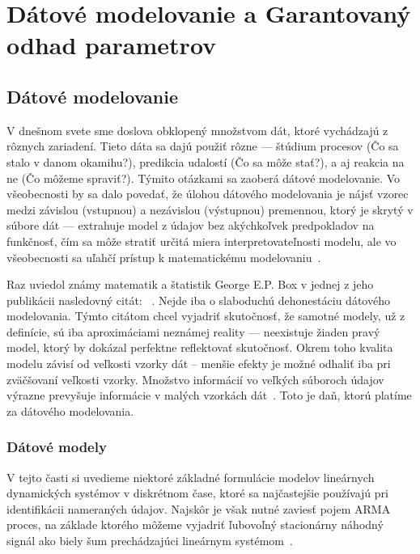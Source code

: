 \part{Dátové modelovanie a Garantovaný odhad parametrov}
\chapter{Dátové modelovanie}
V dnešnom svete sme doslova obklopený množstvom dát, ktoré vychádzajú z rôznych zariadení. Tieto dáta sa dajú použiť rôzne --- štúdium procesov (Čo sa stalo v danom okamihu?), predikcia udalostí (Čo sa môže stať?), a aj reakcia na ne (Čo môžeme spraviť?). Týmito otázkami sa zaoberá dátové modelovanie. Vo všeobecnosti by sa dalo povedať, že úlohou dátového modelovania je nájsť vzorec medzi závislou (vstupnou) a nezávislou (výstupnou) premennou, ktorý je skrytý v súbore dát --- extrahuje model z údajov bez akýchkoľvek predpokladov na funkčnosť, čím sa môže stratiť určitá miera interpretovateľnosti modelu, ale vo všeobecnosti sa uľahčí prístup k matematickému modelovaniu~\cite{mishra:data_modeling:2018}.

Raz uviedol známy matematik a štatistik George E.P. Box  v jednej z jeho publikácii nasledovný citát: ~\cite{box:sas:1976}. Nejde iba o slaboduchú dehonestáciu dátového modelovania. Týmto citátom chcel vyjadriť skutočnosť, že samotné modely, už z definície, sú iba aproximáciami neznámej reality --- neexistuje žiaden pravý model, ktorý by dokázal perfektne reflektovať skutočnosť. Okrem toho kvalita modelu závisí od veľkosti vzorky dát -- menšie efekty je možné odhaliť iba pri zväčšovaní veľkosti vzorky. Množstvo informácií vo veľkých súboroch údajov výrazne prevyšuje informácie v malých vzorkách dát~\cite{kenneth:understanding_stand_crit:2004}. Toto je daň, ktorú platíme za  dátového modelovania.

\section{Dátové modely}
V tejto časti si uvedieme niektoré základné formulácie modelov lineárnych dynamických systémov v diskrétnom čase, ktoré sa najčastejšie používajú pri identifikácii nameraných údajov. Najskôr je však nutné zaviesť pojem ARMA proces, na základe ktorého môžeme vyjadriť ľubovoľný stacionárny náhodný signál ako biely šum prechádzajúci lineárnym systémom~\cite{fikar:identifikacia:1999}.

